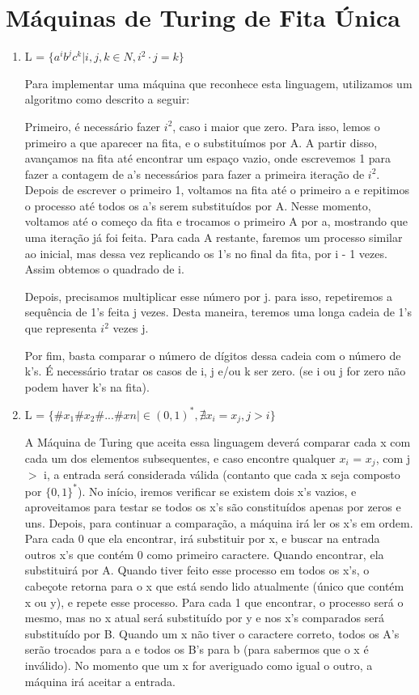 
\section{Máquinas de Turing de Fita Única}

\begin{enumerate}[label=(\alph*)]
\item L = $\{a^ib^jc^k \vert i, j, k \in N, i^2 \cdot j = k\}$

Para implementar uma máquina que reconhece esta linguagem, utilizamos um algoritmo como descrito a seguir:

Primeiro, é necessário fazer $i^2$, caso i maior que zero. Para isso, lemos o primeiro a que aparecer na fita, e
o substituímos por A. A partir disso, avançamos na fita até encontrar um espaço vazio, onde escrevemos 1
para fazer a contagem de a's necessários para fazer a primeira iteração de $i^2$. Depois de escrever o primeiro
1, voltamos na fita até o primeiro a e repitimos o processo até todos os a's serem substituídos por A. Nesse momento,
voltamos até o começo da fita e trocamos o primeiro A por a, mostrando que uma iteração já foi feita. Para cada A restante,
faremos um processo similar ao inicial, mas dessa vez replicando os 1's no final da fita, por i - 1 vezes. Assim
obtemos o quadrado de i.

Depois, precisamos multiplicar esse número por j. para isso, repetiremos a sequência de 1's feita j vezes.
Desta maneira, teremos uma longa cadeia de 1's que representa $i^2$ vezes j. 

Por fim, basta comparar o número de dígitos dessa cadeia com o número de k's.
É necessário tratar os casos de i, j e/ou k ser zero. (se i ou j for zero não podem haver k's na fita).

\item L = $\{\#x_1\#x_2\#...\#xn \vert \in (0,1)^*, \nexists x_i = x_j, j > i\}$

A Máquina de Turing que aceita essa linguagem deverá comparar cada x com cada um dos elementos subsequentes,
e caso encontre qualquer $x_i$ = $x_j$, com j $>$ i, a entrada será considerada válida (contanto que cada
x seja composto por $\{0, 1\}^*$). No início, iremos verificar se existem dois x's vazios, e aproveitamos para
testar se todos os x's são constituídos apenas por zeros e uns. Depois, para continuar a comparação, a máquina
irá ler os x's em ordem. 
Para cada 0 que ela encontrar, irá substituir por x, e buscar na entrada outros x's que contém 0 como primeiro caractere. 
Quando encontrar, ela substituirá por A. Quando tiver feito esse processo em todos os x's, o cabeçote retorna para o x que 
está sendo lido atualmente (único que contém x ou y), e repete esse processo. Para cada 1 que encontrar, o processo
será o mesmo, mas no x atual será substituído por y e nos x's comparados será substituído por B. Quando um x não tiver
o caractere correto, todos os A's serão trocados para a e todos os B's para b (para sabermos que o x é inválido).
No momento que um x for averiguado como igual o outro, a máquina irá aceitar a entrada.


\end{enumerate}